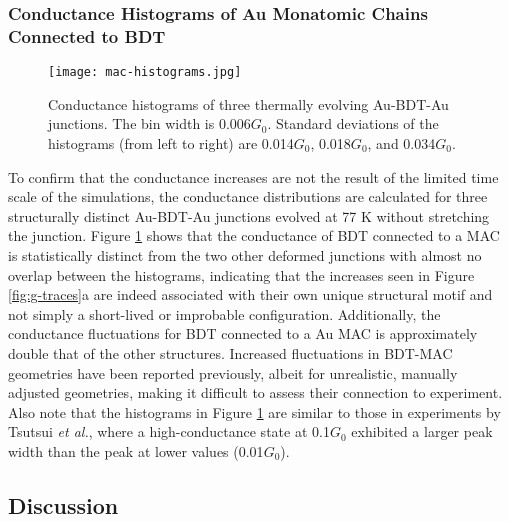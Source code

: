 \documentclass[10pt]{report}  %
\newcommand\findent{\hspace*{\parindent}}
\begin{document}
\subsubsection{Conductance Histograms of Au Monatomic Chains Connected to BDT}

\begin{figure}[h!]
	\centering
	\texttt{[image: mac-histograms.jpg]}
	\caption{Conductance histograms of three thermally evolving Au-BDT-Au junctions. The bin width is 0.006$G_{0}$. Standard deviations of the histograms (from left to right) are 0.014$G_{0}$, 0.018$G_{0}$, and 0.034$G_{0}$. }
	\label{fig:mac-histograms}
\end{figure}

\findent To confirm that the conductance increases are not the result of the limited time scale of the simulations, the conductance distributions are calculated for three structurally distinct Au-BDT-Au junctions evolved at 77 K without stretching the junction. Figure \ref{fig:mac-histograms} shows that the conductance of BDT connected to a MAC is statistically distinct from the two other deformed junctions with almost no overlap between the histograms, indicating that the increases seen in Figure \ref{fig:g-traces}a are indeed associated with their own unique structural motif and not simply a short-lived or improbable configuration. Additionally, the conductance fluctuations for BDT connected to a Au MAC is approximately double that of the other structures. Increased fluctuations in BDT-MAC geometries have been reported previously,\cite{Basch:2005} albeit for unrealistic, manually adjusted geometries, making it difficult to assess their connection to experiment. Also note that the histograms in Figure \ref{fig:mac-histograms} are similar to those in experiments by Tsutsui \textit{et al.}, \cite{Tsutsui:2006} where a high-conductance state at 0.1$G_{0}$ exhibited a larger peak width than the peak at lower values (0.01$G_{0}$). 

\subsection{Discussion}
\end{document}
